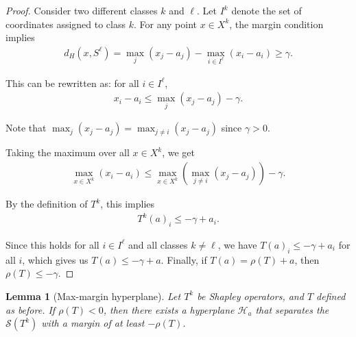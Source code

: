 \documentclass{article}
\newtheorem{lemma}[theorem]{Lemma}
\renewcommand{\geq}{\geqslant}
\renewcommand{\leq}{\leqslant}
\begin{document}
\begin{proof}
Consider two different classes $k$ and $\ell$. Let $I^k$ denote the set of coordinates assigned to class $k$. For any point $x \in X^k$, the margin condition implies
\begin{align}
d_H(x, S^{\ell}) = \max_j(x_j - a_j) - \max_{i \in I^{\ell}}(x_i - a_i) \geq \gamma.
\end{align}

This can be rewritten as: for all $i \in I^{\ell}$,
\begin{align}
x_i - a_i \leq \max_j(x_j - a_j) - \gamma.
\end{align}

Note that $ \max_j(x_j - a_j) = \max_{j\neq i}(x_j - a_j) $ since $\gamma >0$.

Taking the maximum over all $x \in X^k$, we get
\begin{align}
\max_{x \in X^k}(x_i - a_i) \leq \max_{x \in X^k}\left(\max_{j\neq i}(x_j - a_j)\right) - \gamma.
\end{align}

By the definition of $T^k$, this implies
\begin{align}
T^k(a)_i \leq -\gamma + a_i.
\end{align}

Since this holds for all $i \in I^{\ell}$ and all classes $k \neq \ell$, we have $T(a)_i \leq -\gamma + a_i$ for all $i$, which gives us $T(a) \leq -\gamma + a$.
Finally, if $T(a)=\rho(T)+a$, then $\rho(T)\le -\gamma$.
\end{proof}

\begin{lemma}[Max-margin hyperplane]\label{lemma:operator_to_hyperplane}
Let $T^k$ be Shapley operators, and $T$ defined as before. If $\rho(T) < 0$, then there exists a hyperplane $\mathcal{H}_a$ that separates the $\mathcal{S}(T^k)$ with a margin of at least $-\rho(T)$.
\end{lemma}
\end{document}
